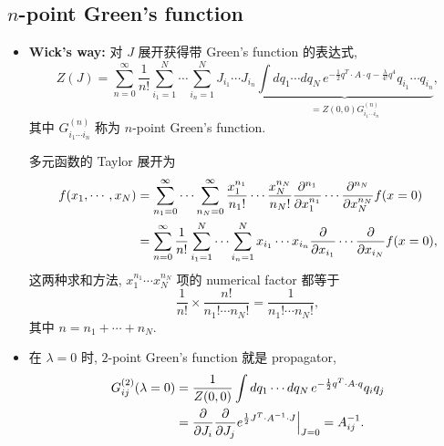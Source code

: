 \subsection{\texorpdfstring{$n$}{n}-point Green's function}
\begin{itemize}
	\item \textbf{Wick's way:} 对 $J$ 展开获得带 Green's function 的表达式,
	\begin{equation}
		Z(J) = \sum_{n = 0}^\infty \frac{1}{n!} \sum_{i_1 = 1}^N \cdots \sum_{i_n = 1}^N J_{i_1} \cdots J_{i_n} \underbrace{\int dq_1 \cdots dq_N \, e^{- \frac{1}{2} q^T \cdot A \cdot q - \frac{\lambda}{4!} q^4} q_{i_1} \cdots q_{i_n}}_{= Z(0, 0) G^{(n)}_{i_1 \cdots i_n}},
	\end{equation}
	其中 $G^{(n)}_{i_1 \cdots i_n}$ 称为 $n$-point Green's function.
	
	\begin{tcolorbox}[title=Taylor expansion:]
		多元函数的 Taylor 展开为
		\begin{align}
			f(x_1, \cdots, x_N) &= \sum_{n_1 = 0}^\infty \cdots \sum_{n_N = 0}^\infty \frac{x_1^{n_1}}{n_1 !} \cdots \frac{x_N^{n_N}}{n_N !} \frac{\partial^{n_1}}{\partial x_1^{n_1}} \cdots \frac{\partial^{n_N}}{\partial x_N^{n_N}} f(x = 0) \notag \\
			&= \sum_{n = 0}^\infty \frac{1}{n!} \sum_{i_1 = 1}^N \cdots \sum_{i_n = 1}^N x_{i_1} \cdots x_{i_n} \frac{\partial}{\partial x_{i_1}} \cdots \frac{\partial}{\partial x_{i_N}} f(x = 0),
		\end{align}
		这两种求和方法, $x_1^{n_1} \cdots x_N^{n_N}$ 项的 numerical factor 都等于
		\begin{equation}
			\frac{1}{n!} \times \frac{n!}{n_1 ! \cdots n_N !} = \frac{1}{n_1 ! \cdots n_N !},
		\end{equation}
		其中 $n = n_1 + \cdots + n_N$.
	\end{tcolorbox}
	
	\item 在 $\lambda = 0$ 时, $2$-point Green's function 就是 propagator,
	\begin{align}
		G^{(2)}_{i j}(\lambda = 0) &= \frac{1}{Z(0, 0)} \int dq_1 \cdots dq_N \, e^{- \frac{1}{2} q^T \cdot A \cdot q} q_i q_j \notag \\
		&= \frac{\partial}{\partial J_i} \frac{\partial}{\partial J_j} e^{\frac{1}{2} J^T \cdot A^{- 1} \cdot J} \Big|_{J = 0} = A^{- 1}_{i j}.
	\end{align}
	

\end{itemize}
